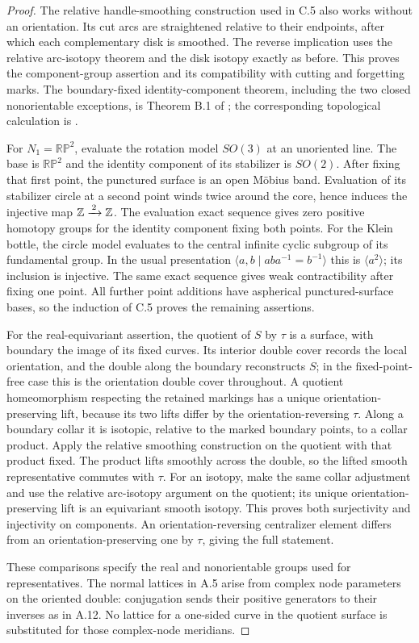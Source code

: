 \begin{proof}
The relative handle-smoothing construction used in C.5 also works
without an orientation. Its cut arcs are straightened relative to
their endpoints, after which each complementary disk is smoothed.
The reverse implication uses the relative arc-isotopy theorem and
the disk isotopy exactly as before. This proves the component-group
assertion and its compatibility with cutting and forgetting marks.
The boundary-fixed identity-component theorem, including the two
closed nonorientable exceptions, is Theorem B.1 of
\cite{HatcherMW2018}; the corresponding topological calculation is
\cite[Theorem 1.5.2]{Hamstrom1974}.

For $N_1=\mathbb{RP}^2$, evaluate the rotation model $SO(3)$ at
an unoriented line. The base is $\mathbb{RP}^2$ and the identity
component of its stabilizer is $SO(2)$. After fixing that first
point, the punctured surface is an open M\"obius band. Evaluation
of its stabilizer circle at a second point winds twice around the
core, hence induces the injective map $\mathbb Z\xrightarrow{\,2\,}\mathbb Z$.
The evaluation exact sequence gives zero positive homotopy groups
for the identity component fixing both points. For the Klein
bottle, the circle model evaluates to the central infinite cyclic
subgroup of its fundamental group. In the usual presentation
$\langle a,b\mid aba^{-1}=b^{-1}\rangle$ this is
$\langle a^2\rangle$; its inclusion is injective. The same exact
sequence gives weak contractibility after fixing one point.
All further point additions have aspherical punctured-surface
bases, so the induction of C.5 proves the remaining assertions.

For the real-equivariant assertion, the quotient of $S$ by $\tau$
is a surface, with boundary the image of its fixed curves. Its
interior double cover records the local orientation, and the double
along the boundary reconstructs $S$; in the fixed-point-free case
this is the orientation double cover throughout. A quotient
homeomorphism respecting the retained markings has a unique
orientation-preserving lift, because its two lifts differ by the
orientation-reversing $\tau$. Along a boundary collar it is
isotopic, relative to the marked boundary points, to a collar
product. Apply the relative smoothing construction on the quotient
with that product fixed. The product lifts smoothly across the
double, so the lifted smooth representative commutes with $\tau$.
For an isotopy, make the same collar adjustment and use the
relative arc-isotopy argument on the quotient; its unique
orientation-preserving lift is an equivariant smooth isotopy.
This proves both surjectivity and injectivity on components. An
orientation-reversing centralizer element differs from an
orientation-preserving one by $\tau$, giving the full statement.

These comparisons specify the real and nonorientable groups used
for representatives. The normal lattices in A.5 arise from complex
node parameters on the oriented double: conjugation sends their
positive generators to their inverses as in A.12. No lattice for
a one-sided curve in the quotient surface is substituted for
those complex-node meridians.
\end{proof}
